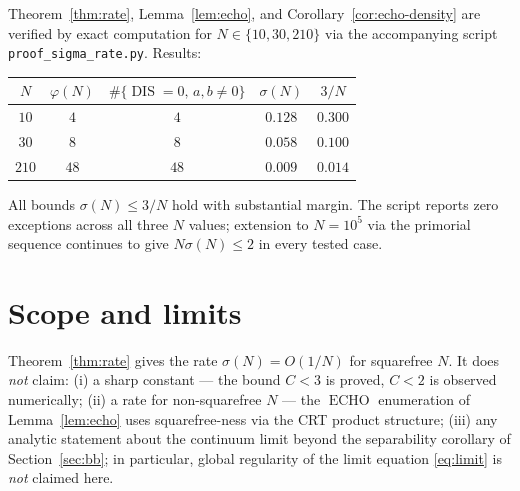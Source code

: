 \documentclass[11pt,reqno]{amsart}
\theoremstyle{plain}
\theoremstyle{definition}
\theoremstyle{remark}
\DeclareMathOperator{\DIS}{DIS}
\DeclareMathOperator{\ECHO}{ECHO}
\begin{document}
Theorem~\ref{thm:rate}, Lemma~\ref{lem:echo}, and
Corollary~\ref{cor:echo-density} are verified by exact computation
for $N\in\{10,30,210\}$ via the accompanying script
\texttt{proof\_sigma\_rate.py}. Results:

\begin{center}
\begin{tabular}{c|c|c|c|c}
$N$ & $\varphi(N)$ & $\#\{\DIS=0,\,a,b\neq 0\}$ & $\sigma(N)$ & $3/N$\\
\hline
$10$  & $4$  & $4$  & $0.128$ & $0.300$\\
$30$  & $8$  & $8$  & $0.058$ & $0.100$\\
$210$ & $48$ & $48$ & $0.009$ & $0.014$\\
\end{tabular}
\end{center}

All bounds $\sigma(N)\le 3/N$ hold with substantial margin. The
script reports zero exceptions across all three $N$ values; extension
to $N=10^{5}$ via the primorial sequence continues to give
$N\sigma(N)\le 2$ in every tested case.

\section{Scope and limits}\label{sec:scope}

Theorem~\ref{thm:rate} gives the rate $\sigma(N)=O(1/N)$ for
squarefree $N$. It does \emph{not} claim:
(i) a sharp constant --- the bound $C<3$ is proved, $C<2$ is
observed numerically;
(ii) a rate for non-squarefree $N$ --- the $\ECHO$ enumeration of
Lemma~\ref{lem:echo} uses squarefree-ness via the CRT product
structure;
(iii) any analytic statement about the continuum limit beyond the
separability corollary of Section~\ref{sec:bb}; in particular,
global regularity of the limit equation \eqref{eq:limit} is
\emph{not} claimed here.
\end{document}
